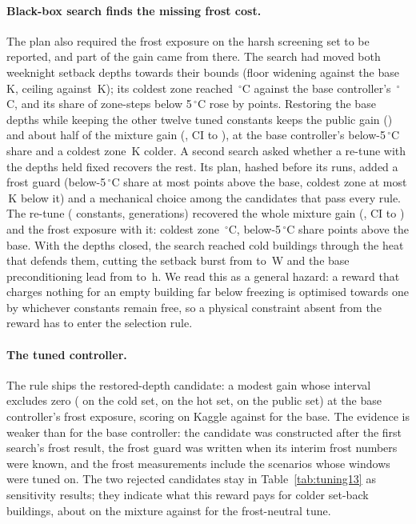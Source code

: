 \documentclass{article}
\begin{document}
\paragraph{Black-box search finds the missing frost cost.} The plan also required the frost exposure on the harsh screening set to be reported, and part of the gain came from there. The search had moved both weeknight setback depths towards their bounds (floor widening \RTwCandNightLow{} against the base \RTwVTwelveNightLow\,K, ceiling \RTwCandNightHigh{} against \RTwVTwelveNightHigh\,K); its coldest zone reached \RTwCandColdest\,$^\circ$C against the base controller's \RTwVTwelveColdest\,$^\circ$C, and its share of zone-steps below 5\,$^\circ$C rose by \RTwCandBelowFiveRise{} points. Restoring the base depths while keeping the other twelve tuned constants keeps the public gain (\RTwVarPub) and about half of the mixture gain (\RTwVarMix, CI \RTwVarMixLo{} to \RTwVarMixHi), at the base controller's below-5\,$^\circ$C share and a coldest zone \RTwVarColderK\,K colder. A second search asked whether a re-tune with the depths held fixed recovers the rest. Its plan, hashed before its runs, added a frost guard (below-5\,$^\circ$C share at most \RTwGuardPP{} points above the base, coldest zone at most \RTwGuardK\,K below it) and a mechanical choice among the candidates that pass every rule. The re-tune (\RTwNParamsThr{} constants, \RTwGensThr{} generations) recovered the whole mixture gain (\RTwThrMix, CI \RTwThrMixLo{} to \RTwThrMixHi) and the frost exposure with it: coldest zone \RTwThrColdest\,$^\circ$C, below-5\,$^\circ$C share \RTwThrBelowFiveRise{} points above the base. With the depths closed, the search reached cold buildings through the heat that defends them, cutting the setback burst from \RTwVarQSb{} to \RTwThrQSb\,W and the base preconditioning lead from \RTwVarLeadBase{} to \RTwThrLeadBase\,h. We read this as a general hazard: a reward that charges nothing for an empty building far below freezing is optimised towards one by whichever constants remain free, so a physical constraint absent from the reward has to enter the selection rule.

\paragraph{The tuned controller.} The rule ships the restored-depth candidate: a modest gain whose interval excludes zero (\RTwVarHCThree{} on the cold set, \RTwVarHH{} on the hot set, \RTwVarPub{} on the public set) at the base controller's frost exposure, scoring \RTwKagVThirteen{} on Kaggle against \RTenKagVTwelve{} for the base. The evidence is weaker than for the base controller: the candidate was constructed after the first search's frost result, the frost guard was written when its interim frost numbers were known, and the frost measurements include the scenarios whose windows were tuned on. The two rejected candidates stay in Table~\ref{tab:tuning13} as sensitivity results; they indicate what this reward pays for colder set-back buildings, about \RTwCandMixAbs{} on the mixture against \RTwVarMixAbs{} for the frost-neutral tune.
\end{document}

